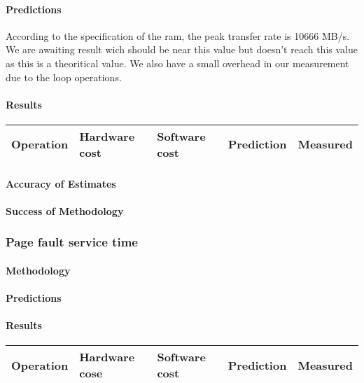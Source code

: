 \paragraph{Predictions}
According to the specification of the ram, the peak transfer rate is 10666 MB/s.
We are awaiting result wich should be near this value but doesn't reach this value as this is a theoritical value.
We also have a small overhead in our measurement due to the loop operations.

\paragraph{Results}

\begin{center}
\begin{tabular}{| l | l | l | l | l |}
\hline
Operation & Hardware cost & Software cost & Prediction & Measured \\
\hline
\end{tabular}
\end{center}
\paragraph{Accuracy of Estimates}
\paragraph{Success of Methodology}





\subsubsection{Page fault service time}
\paragraph{Methodology}
\paragraph{Predictions}
\paragraph{Results}

\begin{center}
\begin{tabular}{| l | l | l | l | l |}
\hline
Operation & Hardware cose & Software cost & Prediction & Measured \\
\hline
\end{tabular}
\end{center}

